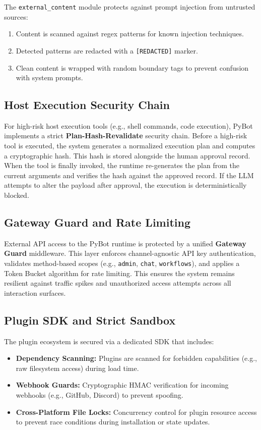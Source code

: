\documentclass[11pt,a4paper]{article}
\begin{document}
The \texttt{external\_content} module protects against prompt injection from untrusted sources:
\begin{enumerate}
  \item Content is scanned against regex patterns for known injection techniques.
  \item Detected patterns are redacted with a \texttt{[REDACTED]} marker.
  \item Clean content is wrapped with random boundary tags to prevent confusion with system prompts.
\end{enumerate}

\subsection{Host Execution Security Chain}

For high-risk host execution tools (e.g., shell commands, code execution), PyBot implements a strict \textbf{Plan-Hash-Revalidate} security chain.
Before a high-risk tool is executed, the system generates a normalized execution plan and computes a cryptographic hash. This hash is stored alongside the human approval record.
When the tool is finally invoked, the runtime re-generates the plan from the current arguments and verifies the hash against the approved record. If the LLM attempts to alter the payload after approval, the execution is deterministically blocked.

\subsection{Gateway Guard and Rate Limiting}

External API access to the PyBot runtime is protected by a unified \textbf{Gateway Guard} middleware.
This layer enforces channel-agnostic API key authentication, validates method-based scopes (e.g., \texttt{admin}, \texttt{chat}, \texttt{workflows}), and applies a Token Bucket algorithm for rate limiting. This ensures the system remains resilient against traffic spikes and unauthorized access attempts across all interaction surfaces.

\subsection{Plugin SDK and Strict Sandbox}

The plugin ecosystem is secured via a dedicated SDK that includes:
\begin{itemize}
  \item \textbf{Dependency Scanning:} Plugins are scanned for forbidden capabilities (e.g., raw filesystem access) during load time.
  \item \textbf{Webhook Guards:} Cryptographic HMAC verification for incoming webhooks (e.g., GitHub, Discord) to prevent spoofing.
  \item \textbf{Cross-Platform File Locks:} Concurrency control for plugin resource access to prevent race conditions during installation or state updates.
\end{itemize}
\end{document}
